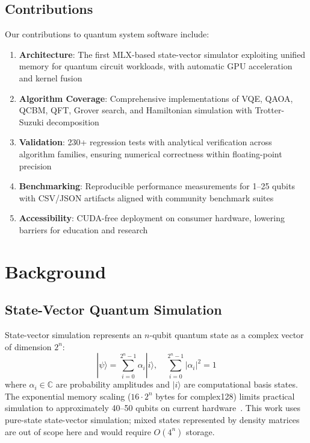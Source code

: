 \documentclass[runningheads]{llncs}
\begin{document}
\subsection{Contributions}

Our contributions to quantum system software include:
\begin{enumerate}
    \item \textbf{Architecture}: The first MLX-based state-vector simulator exploiting unified memory for quantum circuit workloads, with automatic GPU acceleration and kernel fusion
    \item \textbf{Algorithm Coverage}: Comprehensive implementations of VQE, QAOA, QCBM, QFT, Grover search, and Hamiltonian simulation with Trotter-Suzuki decomposition
    \item \textbf{Validation}: 230+ regression tests with analytical verification across algorithm families, ensuring numerical correctness within floating-point precision
    \item \textbf{Benchmarking}: Reproducible performance measurements for 1--25 qubits with CSV/JSON artifacts aligned with community benchmark suites
    \item \textbf{Accessibility}: CUDA-free deployment on consumer hardware, lowering barriers for education and research
\end{enumerate}

\section{Background}

\subsection{State-Vector Quantum Simulation}

State-vector simulation represents an $n$-qubit quantum state as a complex vector of dimension $2^n$:
\begin{equation}
|\psi\rangle = \sum_{i=0}^{2^n-1} \alpha_i |i\rangle, \quad \sum_{i=0}^{2^n-1} |\alpha_i|^2 = 1
\end{equation}
where $\alpha_i \in \mathbb{C}$ are probability amplitudes and $|i\rangle$ are computational basis states. The exponential memory scaling ($16 \cdot 2^n$ bytes for complex128) limits practical simulation to approximately 40--50 qubits on current hardware~\cite{QuantumSimulation2025}.
This work uses pure-state state-vector simulation; mixed states represented by density matrices are out of scope here and would require $O(4^n)$ storage.
\end{document}
